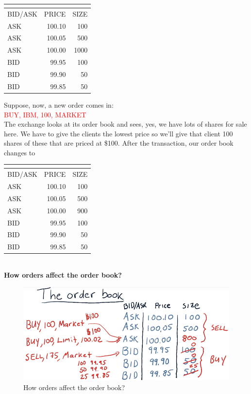 \documentclass[12pt]{article}
\begin{document}
\begin{table}[!ht]
\centering
\begin{tabular}{l | r | r }
\multicolumn{2}{c}{} \\ [-10pt]
\hline
BID/ASK & PRICE & SIZE \\
\hline
ASK & 100.10 & 100 \\
\hline
ASK & 100.05 & 500 \\
\hline
ASK & 100.00 & 1000 \\
\hline
BID & 99.95 & 100 \\
\hline
BID & 99.90 & 50 \\
\hline
BID & 99.85 & 50 \\
\hline
\end{tabular}
\end{table}

\noindent
Suppose, now, a new order comes in:\\
\textcolor{red}{BUY, IBM, 100, MARKET} \\
The exchange looks at its order book and sees, yes, we have lots of shares for sale here. We have to give the clients the lowest price so we'll give that client 100 shares of these that are priced at \$100. After the transaction, our order book changes to 
\begin{table}[!ht]
\centering
\begin{tabular}{l | r | r }
\multicolumn{2}{c}{} \\ [-10pt]
\hline
BID/ASK & PRICE & SIZE \\
\hline
ASK & 100.10 & 100 \\
\hline
ASK & 100.05 & 500 \\
\hline
ASK & 100.00 & 900 \\
\hline
BID & 99.95 & 100 \\
\hline
BID & 99.90 & 50 \\
\hline
BID & 99.85 & 50 \\
\hline
\end{tabular}
\end{table}

\textcolor{white}{.}\\[20pt]

\noindent
\textbf{How orders affect the order book?}
\begin{figure}[!ht]
\centering
\includegraphics[scale=0.45]{fig/fig27}
\caption{How orders affect the order book?}
\end{figure}
\end{document}
